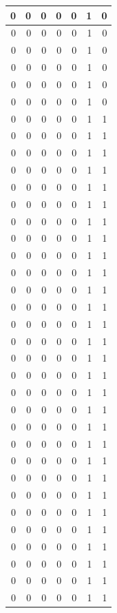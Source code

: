 \documentclass[
  12pt,
]{krantz}
\begin{document}
\begin{tabular}{r|r|r|r|r|r|r}
\hline
0 & 0 & 0 & 0 & 0 & 1 & 0\\
\hline
0 & 0 & 0 & 0 & 0 & 1 & 0\\
\hline
0 & 0 & 0 & 0 & 0 & 1 & 0\\
\hline
0 & 0 & 0 & 0 & 0 & 1 & 0\\
\hline
0 & 0 & 0 & 0 & 0 & 1 & 0\\
\hline
0 & 0 & 0 & 0 & 0 & 1 & 0\\
\hline
0 & 0 & 0 & 0 & 0 & 1 & 1\\
\hline
0 & 0 & 0 & 0 & 0 & 1 & 1\\
\hline
0 & 0 & 0 & 0 & 0 & 1 & 1\\
\hline
0 & 0 & 0 & 0 & 0 & 1 & 1\\
\hline
0 & 0 & 0 & 0 & 0 & 1 & 1\\
\hline
0 & 0 & 0 & 0 & 0 & 1 & 1\\
\hline
0 & 0 & 0 & 0 & 0 & 1 & 1\\
\hline
0 & 0 & 0 & 0 & 0 & 1 & 1\\
\hline
0 & 0 & 0 & 0 & 0 & 1 & 1\\
\hline
0 & 0 & 0 & 0 & 0 & 1 & 1\\
\hline
0 & 0 & 0 & 0 & 0 & 1 & 1\\
\hline
0 & 0 & 0 & 0 & 0 & 1 & 1\\
\hline
0 & 0 & 0 & 0 & 0 & 1 & 1\\
\hline
0 & 0 & 0 & 0 & 0 & 1 & 1\\
\hline
0 & 0 & 0 & 0 & 0 & 1 & 1\\
\hline
0 & 0 & 0 & 0 & 0 & 1 & 1\\
\hline
0 & 0 & 0 & 0 & 0 & 1 & 1\\
\hline
0 & 0 & 0 & 0 & 0 & 1 & 1\\
\hline
0 & 0 & 0 & 0 & 0 & 1 & 1\\
\hline
0 & 0 & 0 & 0 & 0 & 1 & 1\\
\hline
0 & 0 & 0 & 0 & 0 & 1 & 1\\
\hline
0 & 0 & 0 & 0 & 0 & 1 & 1\\
\hline
0 & 0 & 0 & 0 & 0 & 1 & 1\\
\hline
0 & 0 & 0 & 0 & 0 & 1 & 1\\
\hline
0 & 0 & 0 & 0 & 0 & 1 & 1\\
\hline
0 & 0 & 0 & 0 & 0 & 1 & 1\\
\hline
0 & 0 & 0 & 0 & 0 & 1 & 1\\
\hline
0 & 0 & 0 & 0 & 0 & 1 & 1\\
\hline
0 & 0 & 0 & 0 & 0 & 1 & 1\\

\end{tabular}
\end{document}
